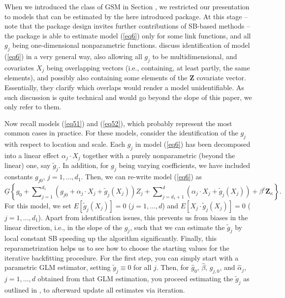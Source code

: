 When we introduced the class of GSM in Section , we restricted our presentation to  models that can be estimated by the here introduced package. At this stage -- note that the package design invites further contributions of SB-based methods -- the package is able to estimate model (\ref{eq6}) only for some link functions, and all $g_j$ being one-dimensional nonparametric functions. \cite{LMP2012} discuss identification of model (\ref{eq6}) in a very general way, also allowing all $g_j$ to be multidimensional, and covariates $X_j$ being overlapping vectors (i.e., containing, at least partly, the same elements), and possibly also containing some elements of the ${\mathbf Z}$ covariate vector. Essentially, they clarify which overlaps would render a model unidentifiable. As such discussion is quite technical and would go beyond the slope of this paper, we only refer to them.

Now recall models (\ref{eq51}) and (\ref{eq52}), which probably represent the most common cases in practice. For these models, consider the identification of the $g_j$ with respect to location and scale. Each $g_j$ in model (\ref{eq6}) has been decomposed into a linear effect $\alpha_j \cdot X_j$ together with a purely nonparametric (beyond the linear) one, say $\tilde g_j$. In addition, for $g_j$ being varying coefficients, we have included constants $g_{j0}$, $j=1,\ldots ,d_1$. Then, we can re-write model (\ref{eq6}) as
\begin{equation}\label{model-new-id}
\underline{G} \left\{ {g_0 + \sum\nolimits_{j = 1}^{d_1} \left({ g_{j0}+ \alpha_j\cdot X_j +\tilde g_j \left( {X_j } \right)}\right) Z_j + \sum\nolimits_{j = d_1+1}^{d} \left({\alpha_j\cdot X_j +\tilde g_j \left( {X_j } \right)}\right) + \beta^t {\mathbf Z}_\kappa } \right\}.
\end{equation}
For this model, we set $E[\tilde g_j(X_j)] = 0$ ($j=1,\ldots,d$) and $E[X_j\cdot \tilde g_j(X_j)]=0$ ($j=1,\ldots,d_1$). Apart from identification issues, this prevents us from biases in the linear direction, i.e., in the slope of the $g_j$, such that we can estimate the $\tilde g_j$ by local constant SB speeding up the algorithm significantly.
Finally, this reparametrization helps us to see how to choose the starting values for the iterative 
backfitting procedure. For the first step, you can simply start with a parametric GLM estimator, setting $\tilde g_j \equiv 0$ for all $j$. Then, for $\hat g_0$, $\hat\beta$, $\hat g_{j,0}$, and $\hat\alpha_j$, $j=1,\ldots ,d$ obtained from that GLM estimation, you proceed estimating the $\tilde g_j$ as outlined in \cite{RS2010}, to afterward update all estimates via iteration. 


